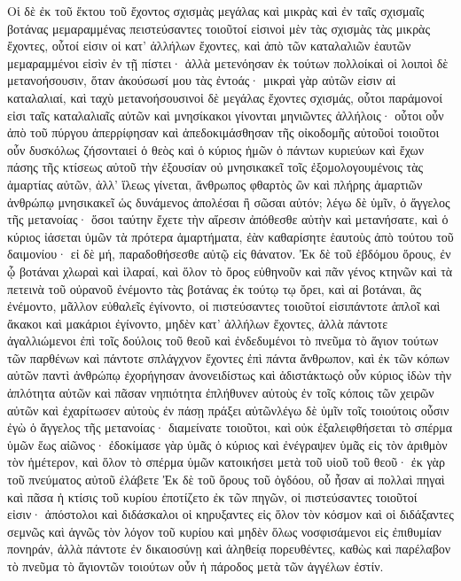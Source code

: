 Οἱ δὲ ἐκ τοῦ ἕκτου τοῦ ἔχοντος σχισμὰς μεγάλας καὶ μικρὰς καὶ ἐν ταῖς σχισμαῖς βοτάνας μεμαραμμένας πειστεύσαντες τοιοῦτοί εἰσινοἱ μὲν τὰς σχισμὰς τὰς μικρὰς ἔχοντες, οὗτοί εἰσιν οἱ κατ’ ἀλλήλων ἔχοντες, καὶ ἀπὸ τῶν καταλαλιῶν ἑαυτῶν μεμαραμμένοι εἰσὶν ἐν τῇ πίστει· ἀλλὰ μετενόησαν ἐκ τούτων πολλοίκαὶ οἱ λοιποὶ δὲ μετανοήσουσιν, ὅταν ἀκούσωσί μου τὰς ἐντοάς· μικραὶ γὰρ αὐτῶν εἰσιν αἱ καταλαλιαί, καὶ ταχὺ μετανοήσουσινοἱ δὲ μεγάλας ἔχοντες σχισμάς, οὗτοι παράμονοί εἰσι ταῖς καταλαλιαῖς αὐτῶν καὶ μνησίκακοι γίνονται μηνιῶντες ἀλλήλοις· οὗτοι οὖν ἀπὸ τοῦ πύργου ἀπερρίφησαν καὶ ἀπεδοκιμάσθησαν τῆς οἰκοδομῆς αὐτοῦοἱ τοιοῦτοι οὖν δυσκόλως ζήσονταιεἰ ὁ θεὸς καὶ ὁ κύριος ἡμῶν ὁ πάντων κυριεύων καὶ ἔχων πάσης τῆς κτίσεως αὐτοῦ τὴν ἐξουσίαν οὐ μνησικακεῖ τοῖς ἐξομολογουμένοις τὰς ἁμαρτίας αὐτῶν, ἀλλ’ ἵλεως γίνεται, ἄνθρωπος φθαρτὸς ὢν καὶ πλήρης ἁμαρτιῶν ἀνθρώπῳ μνησικακεῖ ὡς δυνάμενος ἀπολέσαι ἢ σῶσαι αὐτόν; λέγω δὲ ὑμῖν, ὁ ἄγγελος τῆς μετανοίας· ὅσοι ταύτην ἔχετε τὴν αἵρεσιν ἀπόθεσθε αὐτὴν καὶ μετανήσατε, καὶ ὁ κύριος ἰάσεται ὑμῶν τὰ πρότερα ἁμαρτήματα, ἐὰν καθαρίσητε ἑαυτοὺς ἀπὸ τούτου τοῦ δαιμονίου· εἰ δὲ μή, παραδοθήσεσθε αὐτῷ εἰς θάνατον.
Ἐκ δὲ τοῦ ἑβδόμου ὄρους, ἐν ᾧ βοτάναι χλωραὶ καὶ ἱλαραί, καὶ ὅλον τὸ ὄρος εὐθηνοῦν καὶ πᾶν γένος κτηνῶν καὶ τὰ πετεινὰ τοῦ οὐρανοῦ ἐνέμοντο τὰς βοτάνας ἐκ τούτῳ τῳ ὄρει, καὶ αἱ βοτάναι, ἃς ἐνέμοντο, μᾶλλον εὐθαλεῖς ἐγίνοντο, οἱ πιστεύσαντες τοιοῦτοί εἰσιπάντοτε ἁπλοῖ καὶ ἄκακοι καὶ μακάριοι ἐγίνοντο, μηδὲν κατ’ ἀλλήλων ἔχοντες, ἀλλὰ πάντοτε ἀγαλλιώμενοι ἐπὶ τοῖς δούλοις τοῦ θεοῦ καὶ ἐνδεδυμένοι τὸ πνεῦμα τὸ ἅγιον τούτων τῶν παρθένων καὶ πάντοτε σπλάγχνον ἔχοντες ἐπὶ πάντα ἄνθρωπον, καὶ ἐκ τῶν κόπων αὐτῶν παντὶ ἀνθρώπῳ ἐχορήγησαν ἀνονειδίστως καὶ ἀδιστάκτωςὁ οὖν κύριος ἰδὼν τὴν ἁπλότητα αὐτῶν καὶ πᾶσαν νηπιότητα ἐπλήθυνεν αὐτοὺς ἐν τοῖς κόποις τῶν χειρῶν αὐτῶν καὶ ἐχαρίτωσεν αὐτοὺς ἐν πάσῃ πράξει αὐτῶνλέγω δὲ ὑμῖν τοῖς τοιούτοις οὖσιν ἐγὼ ὁ ἄγγελος τῆς μετανοίας· διαμείνατε τοιοῦτοι, καὶ οὐκ ἐξαλειφθήσεται τὸ σπέρμα ὑμῶν ἕως αἰῶνος· ἐδοκίμασε γὰρ ὑμᾶς ὁ κύριος καὶ ἐνέγραψεν ὑμᾶς εἰς τὸν ἀριθμὸν τὸν ἡμέτερον, καὶ ὅλον τὸ σπέρμα ὑμῶν κατοικήσει μετὰ τοῦ υἱοῦ τοῦ θεοῦ· ἐκ γὰρ τοῦ πνεύματος αὐτοῦ ἐλάβετε
Ἐκ δὲ τοῦ ὄρους τοῦ ὀγδόου, οὗ ἦσαν αἱ πολλαὶ πηγαὶ καὶ πᾶσα ἡ κτίσις τοῦ κυρίου ἐποτίζετο ἐκ τῶν πηγῶν, οἱ πιστεύσαντες τοιοῦτοί εἰσιν· ἀπόστολοι καὶ διδάσκαλοι οἱ κηρυξαντες εἰς ὅλον τὸν κόσμον καὶ οἱ διδάξαντες σεμνῶς καὶ ἁγνῶς τὸν λόγον τοῦ κυρίου καὶ μηδὲν ὅλως νοσφισάμενοι εἰς ἐπιθυμίαν πονηράν, ἀλλὰ πάντοτε ἐν δικαιοσύνῃ καὶ ἀληθείᾳ πορευθέντες, καθὼς καὶ παρέλαβον τὸ πνεῦμα τὸ ἅγιοντῶν τοιούτων οὖν ἡ πάροδος μετὰ τῶν ἀγγέλων ἐστίν.
